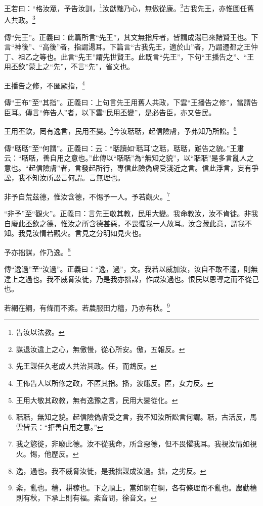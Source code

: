 王若曰：“格汝眾，予告汝訓，\footnote{告汝以法教。}汝猷黜乃心，無傲從康。\footnote{謀退汝違上之心，無傲慢，從心所安。傲，五報反。}古我先王，亦惟圖任舊人共政。\footnote{先王謀任久老成人共治其政。任，而鴆反。}

{\noindent\zhuan{}\fzbyks 傳“先王”。正義曰：此篇所言“先王”，其文無指斥者，皆謂成湯已來諸賢王也。下言“神後”、“高後”者，指謂湯耳。下篇言“古我先王，適於山”者，乃謂遷都之王仲丁、祖乙之等也。此言“先王”謂先世賢王。此既言“先王”，下句“王播告之”、“王用丕欽”蒙上之“先”，不言“先”，省文也。 \par}

王播告之修，不匿厥指，\footnote{王佈告人以所修之政，不匿其指。播，波餓反。匿，女力反。}

{\noindent\zhuan{}\fzbyks 傳“王布”至“其指”。正義曰：上句言先王用舊人共政，下雲“王播告之修”，當謂告臣耳。傳言“佈告人”者，以下雲“民用丕變”，是必告臣，亦又告民。 \par}

王用丕欽，罔有逸言，民用丕變。\footnote{王用大敬其政教，無有逸豫之言，民用大變從化。}今汝聒聒，起信險膚，予弗知乃所訟。\footnote{聒聒，無知之貌。起信險偽膚受之言，我不知汝所訟言何謂。聒，古活反，馬雲皆云：“拒善自用之意。”}

{\noindent\zhuan{}\fzbyks 傳“聒聒”至“何謂”。正義曰：云：“聒讀如‘聒耳’之聒，聒聒，難告之貌。”王肅云：“聒聒，善自用之意也。”此傳以“聒聒”為“無知之貌”，以“聒聒”是多言亂人之意也。“起信險膚”者，言發起所行，專信此險偽膚受淺近之言。信此浮言，妄有爭訟，我不知汝所訟言何謂。言無理也。 \par}

非予自荒茲德，惟汝含德，不惕予一人。予若觀火。\footnote{我之慾徙，非廢此德。汝不從我命，所含惡德，但不畏懼我耳。我視汝情如視火。惕，他歷反。}

{\noindent\shu{}\fzkt “非予”至“觀火”。正義曰：言先王敬其教，民用大變。我命教汝，汝不肯徙。非我自廢此丕欽之德，惟汝之所含德甚惡，不畏懼我一人故耳。汝含藏此意，謂我不知。我見汝情若觀火。言見之分明如見火也。 \par}

予亦拙謀，作乃逸。\footnote{逸，過也。我不威脅汝徙，是我拙謀成汝過。拙，之劣反。}

{\noindent\zhuan{}\fzbyks 傳“逸過”至“汝過”。正義曰：“逸，過”，文。我若以威加汝，汝自不敢不遷，則無違上之過也。我不威脅汝徙，乃是我亦拙謀，作成汝過也。恨民以恩導之而不從己也。 \par}

若網在綱，有條而不紊。若農服田力穡，乃亦有秋。\footnote{紊，亂也。穡，耕稼也。下之順上，當如網在綱，各有條理而不亂也。農勤穡則有秋，下承上則有福。紊音問，徐音文。}

